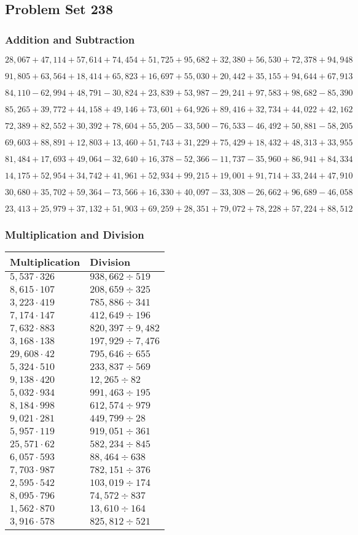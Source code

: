 \hypertarget{problem-set-238}{%
\subsection{Problem Set 238}\label{problem-set-238}}

\hypertarget{addition-and-subtraction}{%
\subsubsection{Addition and
Subtraction}\label{addition-and-subtraction}}

\(28,067+47,114+57,614+74,454+51,725+95,682+32,380+56,530+72,378+94,948\)

\(91,805+63,564+18,414+65,823+16,697+55,030+20,442+35,155+94,644+67,913\)

\(84,110-62,994+48,791-30,824+23,839+53,987-29,241+97,583+98,682-85,390\)

\(85,265+39,772+44,158+49,146+73,601+64,926+89,416+32,734+44,022+42,162\)

\(72,389+82,552+30,392+78,604+55,205-33,500-76,533-46,492+50,881-58,205\)

\(69,603+88,891+12,803+13,460+51,743+31,229+75,429+18,432+48,313+33,955\)

\(81,484+17,693+49,064-32,640+16,378-52,366-11,737-35,960+86,941+84,334\)

\(14,175+52,954+34,742+41,961+52,934+99,215+19,001+91,714+33,244+47,910\)

\(30,680+35,702+59,364-73,566+16,330+40,097-33,308-26,662+96,689-46,058\)

\(23,413+25,979+37,132+51,903+69,259+28,351+79,072+78,228+57,224+88,512\)

\hypertarget{multiplication-and-division}{%
\subsubsection{Multiplication and
Division}\label{multiplication-and-division}}

\begin{longtable}[]{@{}ll@{}}
\toprule
Multiplication & Division\tabularnewline
\midrule
\endhead
\(5,537\cdot326\) & \(938,662÷519\)\tabularnewline
\(8,615\cdot107\) & \(208,659÷325\)\tabularnewline
\(3,223\cdot419\) & \(785,886÷341\)\tabularnewline
\(7,174\cdot147\) & \(412,649÷196\)\tabularnewline
\(7,632\cdot883\) & \(820,397÷9,482\)\tabularnewline
\(3,168\cdot138\) & \(197,929÷7,476\)\tabularnewline
\(29,608\cdot42\) & \(795,646÷655\)\tabularnewline
\(5,324\cdot510\) & \(233,837÷569\)\tabularnewline
\(9,138\cdot420\) & \(12,265÷82\)\tabularnewline
\(5,032\cdot934\) & \(991,463÷195\)\tabularnewline
\(8,184\cdot998\) & \(612,574÷979\)\tabularnewline
\(9,021\cdot281\) & \(449,799÷28\)\tabularnewline
\(5,957\cdot119\) & \(919,051÷361\)\tabularnewline
\(25,571\cdot62\) & \(582,234÷845\)\tabularnewline
\(6,057\cdot593\) & \(88,464÷638\)\tabularnewline
\(7,703\cdot987\) & \(782,151÷376\)\tabularnewline
\(2,595\cdot542\) & \(103,019÷174\)\tabularnewline
\(8,095\cdot796\) & \(74,572÷837\)\tabularnewline
\(1,562\cdot870\) & \(13,610÷164\)\tabularnewline
\(3,916\cdot578\) & \(825,812÷521\)\tabularnewline
\bottomrule
\end{longtable}

